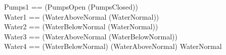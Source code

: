 \begin{zed}
Pumps1 == (PumpsOpen \implies  \lnot(PumpsClosed)) \\
Water1 == (WaterAboveNormal  \implies \lnot(WaterNormal)) \\  
Water2 == (WaterBelowNormal  \implies \lnot (WaterNormal)) \\
Water3 == (WaterAboveNormal  \implies \lnot(WaterBelowNormal))\\
Water4 == \lnot(WaterBelowNormal) \land \lnot(WaterAboveNormal) \implies WaterNormal
\end{zed}


